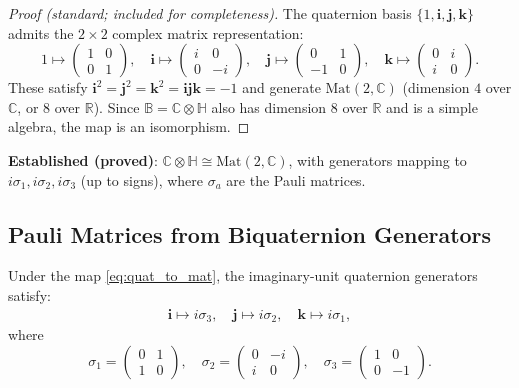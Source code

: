 \documentclass[12pt]{article}
\theoremstyle{definition}
\theoremstyle{remark}
\begin{document}
\begin{proof}[Proof (standard; included for completeness)]
The quaternion basis $\{1, \mathbf{i}, \mathbf{j}, \mathbf{k}\}$ admits the $2\times 2$
complex matrix representation:
\begin{equation}
  1 \mapsto \begin{pmatrix}1&0\\0&1\end{pmatrix},\quad
  \mathbf{i} \mapsto \begin{pmatrix}i&0\\0&-i\end{pmatrix},\quad
  \mathbf{j} \mapsto \begin{pmatrix}0&1\\-1&0\end{pmatrix},\quad
  \mathbf{k} \mapsto \begin{pmatrix}0&i\\i&0\end{pmatrix}.
  \label{eq:quat_to_mat}
\end{equation}
These satisfy $\mathbf{i}^2=\mathbf{j}^2=\mathbf{k}^2=\mathbf{ijk}=-1$ and generate
$\mathrm{Mat}(2,\mathbb{C})$ (dimension $4$ over $\mathbb{C}$, or $8$ over $\mathbb{R}$).
Since $\mathbb{B} = \mathbb{C}\otimes\mathbb{H}$ also has dimension $8$ over $\mathbb{R}$
and is a simple algebra, the map is an isomorphism.
\end{proof}

\begin{resultbox}
\textbf{Established (proved)}: $\mathbb{C}\otimes\mathbb{H}\cong\mathrm{Mat}(2,\mathbb{C})$,
with generators mapping to $i\sigma_1, i\sigma_2, i\sigma_3$ (up to signs), where $\sigma_a$
are the Pauli matrices.
\end{resultbox}

\subsection{Pauli Matrices from Biquaternion Generators}

Under the map \eqref{eq:quat_to_mat}, the imaginary-unit quaternion generators satisfy:
\begin{align}
  \mathbf{i}\mapsto i\sigma_3,\quad
  \mathbf{j}\mapsto i\sigma_2,\quad
  \mathbf{k}\mapsto i\sigma_1,
\end{align}
where
\begin{equation}
  \sigma_1 = \begin{pmatrix}0&1\\1&0\end{pmatrix},\quad
  \sigma_2 = \begin{pmatrix}0&-i\\i&0\end{pmatrix},\quad
  \sigma_3 = \begin{pmatrix}1&0\\0&-1\end{pmatrix}.
\end{equation}
\end{document}
